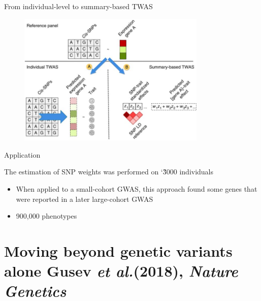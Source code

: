 \documentclass[aspectratio=169,12pt]{beamer}
\newcommand{\etal}{\textit{et al.}\xspace}
\begin{document}
\begin{frame}{From individual-level to summary-based TWAS}

	\begin{figure}
		\includegraphics[width=0.8\textwidth]{gusev2016/1-TWAS_schematic}
	\end{figure}


\end{frame}

\begin{frame}{Application}

	The estimation of SNP weights was performed on \char`\~3000 
individuals

	\begin{itemize}
		\item When applied to a small-cohort GWAS, this approach found 
some genes that were reported in a later large-cohort GWAS
		\item 900,000 phenotypes
	\end{itemize}


\end{frame}

\section{Moving beyond genetic variants alone \newline
\scriptsize Gusev \etal (2018), \textit{Nature Genetics}}
\end{document}
